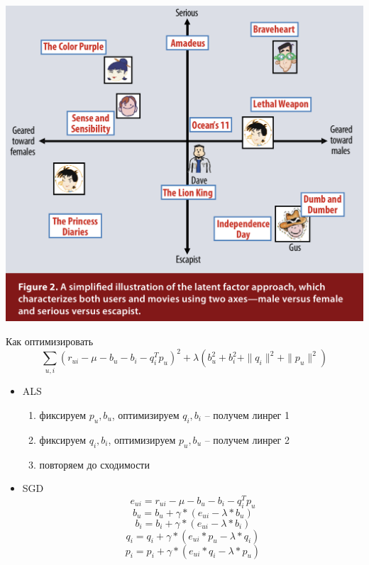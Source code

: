 \documentclass[11pt,aspectratio=169,handout]{beamer}
\begin{document}
\begin{frame}
\begin{center}
\includegraphics[scale=0.3]{images/latent.png}
\end{center}
\end{frame}

\begin{frame}{Как оптимизировать}
\[
\sum_{u, i} (r_{ui} - \mu - b_u - b_i - q_i^T p_u)^2 + \lambda (b_u^2 +  b_i^2 + \| q_i \|^2 + \| p_u \|^2)
\]

\begin{itemize}
\item ALS \cite{IMPLICIT}
\begin{enumerate}
\item фиксируем $p_u, b_u$, оптимизируем $q_i, b_i$ -- получем линрег 1
\item фиксируем  $q_i, b_i$, оптимизируем $p_u, b_u$ -- получем линрег 2
\item повторяем до сходимости
\end{enumerate}
\item SGD
\[
e_{ui} = r_{ui} - \mu - b_u - b_i - q_i^T p_u 
\]
\[
b_u = b_u + \gamma * (e_{ui} - \lambda * b_u) 
\]
\[
b_i = b_i + \gamma * (e_{ui} - \lambda * b_i) 
\]
\[
q_i = q_i + \gamma * (e_{ui}*p_u - \lambda * q_i) 
\]
\[
p_i = p_i + \gamma * (e_{ui}*q_i - \lambda * p_u)
\]
\end{itemize}

\end{frame}
\end{document}
